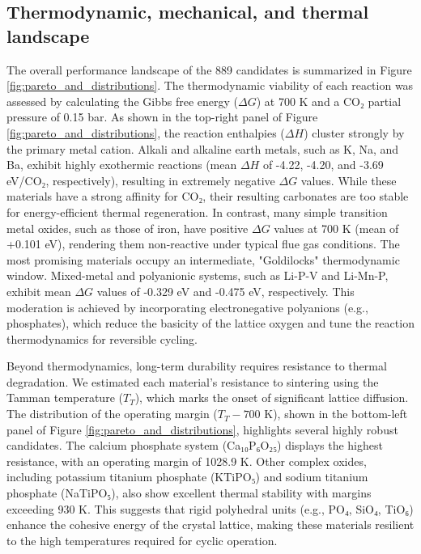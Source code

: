 \documentclass[]{article}
\begin{document}
\subsection{Thermodynamic, mechanical, and thermal landscape}
The overall performance landscape of the 889 candidates is summarized in Figure \ref{fig:pareto_and_distributions}. The thermodynamic viability of each reaction was assessed by calculating the Gibbs free energy ($\Delta G$) at 700 K and a CO₂ partial pressure of 0.15 bar. As shown in the top-right panel of Figure \ref{fig:pareto_and_distributions}, the reaction enthalpies ($\Delta H$) cluster strongly by the primary metal cation. Alkali and alkaline earth metals, such as K, Na, and Ba, exhibit highly exothermic reactions (mean $\Delta H$ of -4.22, -4.20, and -3.69 eV/CO₂, respectively), resulting in extremely negative $\Delta G$ values. While these materials have a strong affinity for CO₂, their resulting carbonates are too stable for energy-efficient thermal regeneration. In contrast, many simple transition metal oxides, such as those of iron, have positive $\Delta G$ values at 700 K (mean of +0.101 eV), rendering them non-reactive under typical flue gas conditions. The most promising materials occupy an intermediate, "Goldilocks" thermodynamic window. Mixed-metal and polyanionic systems, such as Li-P-V and Li-Mn-P, exhibit mean $\Delta G$ values of -0.329 eV and -0.475 eV, respectively. This moderation is achieved by incorporating electronegative polyanions (e.g., phosphates), which reduce the basicity of the lattice oxygen and tune the reaction thermodynamics for reversible cycling.

Beyond thermodynamics, long-term durability requires resistance to thermal degradation. We estimated each material's resistance to sintering using the Tamman temperature ($T_T$), which marks the onset of significant lattice diffusion. The distribution of the operating margin ($T_T - 700$ K), shown in the bottom-left panel of Figure \ref{fig:pareto_and_distributions}, highlights several highly robust candidates. The calcium phosphate system (Ca₁₀P₆O₂₅) displays the highest resistance, with an operating margin of 1028.9 K. Other complex oxides, including potassium titanium phosphate (KTiPO₅) and sodium titanium phosphate (NaTiPO₅), also show excellent thermal stability with margins exceeding 930 K. This suggests that rigid polyhedral units (e.g., PO₄, SiO₄, TiO₆) enhance the cohesive energy of the crystal lattice, making these materials resilient to the high temperatures required for cyclic operation.
\end{document}
